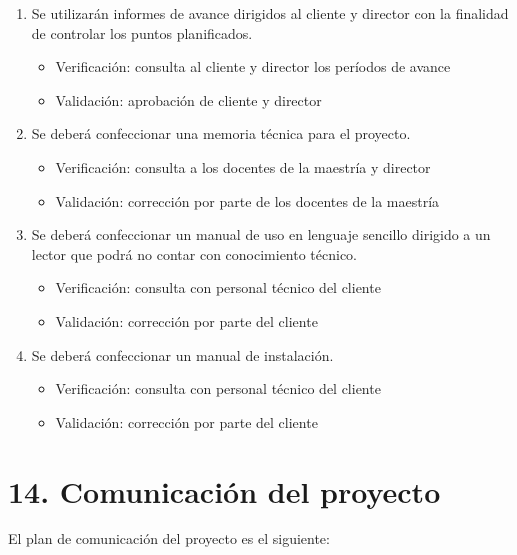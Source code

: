 \documentclass[11pt]{charter}
\begin{document}
\begin{enumerate}
\begin{enumerate}
\begin{itemize}
		\end{itemize}
	\item Se utilizarán informes de avance dirigidos al cliente y director con la finalidad de controlar los puntos planificados.
		\begin{itemize}
			\item Verificación: consulta al cliente y director los períodos de avance 
			\item Validación: aprobación de cliente y director
		\end{itemize}
	\item Se deberá confeccionar una memoria técnica para el proyecto.
		\begin{itemize}
			\item Verificación: consulta a los docentes de la maestría y director
			\item Validación: corrección por parte de los docentes de la maestría
		\end{itemize}
	\item Se deberá confeccionar un manual de uso en lenguaje  sencillo dirigido a un lector que podrá no contar con conocimiento técnico.
		\begin{itemize}
			\item Verificación: consulta con personal técnico del cliente
			\item Validación: corrección por parte del cliente
		\end{itemize}
	\item Se deberá confeccionar un manual de instalación.
		\begin{itemize}
			\item Verificación: consulta con personal técnico del cliente
			\item Validación: corrección por parte del cliente
		\end{itemize}
	\end{enumerate}
\end{enumerate}


\section{14. Comunicación del proyecto}
\label{sec:comunicaciones}

El plan de comunicación del proyecto es el siguiente:
\end{document}
